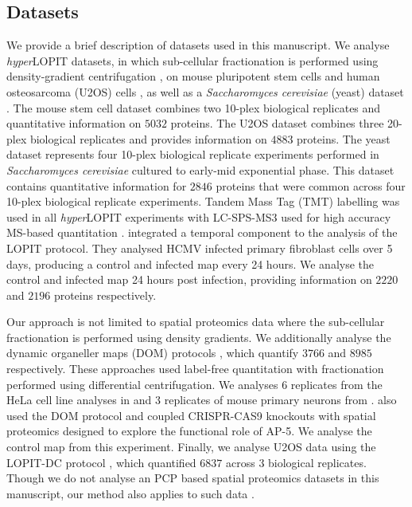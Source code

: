\documentclass[12pt,english]{article}
\begin{document}
\subsection{Datasets}
We provide a brief description of datasets used in this manuscript. We analyse \textit{hyper}LOPIT datasets, in which sub-cellular fractionation is performed using density-gradient centrifugation \citep{Dunkley:2004, Dunkley:2006, Mulvey:2017}, on mouse pluripotent stem cells \citep{hyper} and human osteosarcoma (U2OS) cells \citep{Thul:2017, DC:2018}, as well as a \textit{Saccharomyces cerevisiae} (yeast) dataset \citep{Nightingale::2019}. The mouse stem cell dataset combines two 10-plex biological replicates and quantitative information on $5032$ proteins. The U2OS dataset combines three 20-plex biological replicates and provides information on $4883$ proteins. The yeast dataset represents four 10-plex biological replicate experiments performed in \textit{Saccharomyces cerevisiae} cultured to early-mid exponential phase. This dataset contains quantitative information for $2846$ proteins that were common across four 10-plex biological replicate experiments. Tandem Mass Tag (TMT) \citep{Thompson:2003} labelling was used in all \textit{hyper}LOPIT experiments with LC-SPS-MS3 used for high accuracy MS-based quantitation \citep{Ting:2011, Mcalister::2014}. \cite{Jean_Beltran:2016} integrated a temporal component to the analysis of the LOPIT protocol. They analysed HCMV infected primary fibroblast cells over 5 days, producing a control and infected map every 24 hours. We analyse the control and infected map 24 hours post infection, providing information on $2220$ and $2196$ proteins respectively. 

Our approach is not limited to spatial proteomics data where the sub-cellular fractionation is performed using density gradients. We additionally analyse the dynamic organeller maps (DOM) protocols \citep{Itzhak:2016, Itzhak::2017}, which quantify $3766$ and $8985$ respectively. These approaches used label-free quantitation with fractionation performed using differential centrifugation. We analyses $6$ replicates from the HeLa cell line analyses in \cite{Itzhak:2016} and $3$ replicates of mouse primary neurons from \cite{Itzhak::2017}. \cite{Hirst:2018} also used the DOM protocol and coupled CRISPR-CAS9 knockouts with spatial proteomics designed to explore the functional role of AP-5. We analyse the control map from this experiment. Finally, we analyse U2OS data using the LOPIT-DC protocol \citep{DC:2018}, which quantified $6837$ across $3$ biological replicates. Though we do not analyse an PCP based spatial proteomics datasets in this manuscript, our method also applies to such data \citep{Foster:2006, kristensen:2012, kristensen:2014}.
\end{document}
